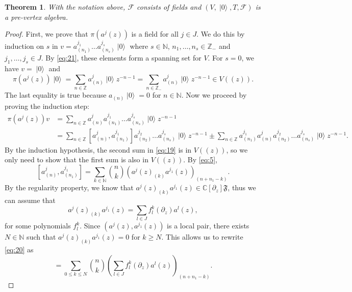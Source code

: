 \documentclass[a4paper, 12pt, reqno]{amsart}
\newtheorem{theorem}{Theorem}[subsection]
\theoremstyle{remark}
\numberwithin{equation}{subsection}
\DeclareMathOperator{\vac}{|0\rangle}
\begin{document}
\begin{theorem}
  \label{thr:15}
  With the notation above, $\mathcal{F}$ consists of fields and $(V, \vac, T, \mathcal{F})$ is a pre-vertex algebra.
\end{theorem}

\begin{proof}
  First, we prove that $\pi(a^j(z))$ is a field for all $j \in J$.
  We do this by induction on $s$ in $v = a^{j_1}_{(n_1)}\dots a^{j_s}_{(n_s)}\vac$ where $s \in \mathbb{N}$, $n_1, \dots, n_s \in \mathbb{Z}_-$ and $j_1, \dots, j_s \in J$.
  By \eqref{eq:21}, these elements form a spanning set for $V$.
  For $s = 0$, we have $v = \vac$ and
  \begin{equation*}
    \pi(a^j(z))\vac = \sum_{n \in \mathbb{Z}} a^j_{(n)}\vac z^{-n - 1} = \sum_{n \in \mathbb{Z}_-} a^j_{(n)}\vac z^{-n - 1} \in V((z)).
  \end{equation*}
  The last equality is true because $a_{(n)}\vac = 0$ for $n \in \mathbb{N}$.
  Now we proceed by proving the induction step:
  \begin{align}
    \nonumber
    \pi(a^j(z))v &= \sum_{n \in \mathbb{Z}}a^j_{(n)}a^{j_1}_{(n_1)}\dots a^{j_s}_{(n_s)}\vac z^{-n - 1} \\
    \label{eq:19}
    &= \sum_{n \in \mathbb{Z}} [a^j_{(n)}, a^{j_1}_{(n_1)}]a^{j_2}_{(n_2)}\dots a^{j_s}_{(n_s)}\vac z^{-n - 1} \pm \sum_{n \in \mathbb{Z}}a^{j_1}_{(n_1)}a^j_{(n)}a^{j_2}_{(n_2)}\dots a^{j_s}_{(n_s)}\vac z^{-n - 1}.
  \end{align}
  By the induction hypothesis, the second sum in \eqref{eq:19} is in $V((z))$, so we only need to show that the first sum is also in $V((z))$.
  By \eqref{eq:5},
  \begin{equation}
    \label{eq:20}
    [a^j_{(n)}, a^{j_1}_{(n_1)}] = \sum_{k \in \mathbb{N}}\binom{n}{k}(a^j(z)_{(k)}a^{j_1}(z))_{(n + n_1 - k)}.
  \end{equation}
  By the regularity property, we know that $a^j(z)_{(k)}a^{j_1}(z) \in \mathbb{C}[\partial_z]\mathfrak{F}$, thus we can assume that
  \begin{equation*}
    a^j(z)_{(k)}a^{j_1}(z) = \sum_{l \in J}f^k_l(\partial_z)a^l(z),
  \end{equation*}
  for some polynomials $f^k_l$.
  Since $(a^j(z), a^{j_1}(z))$ is a local pair, there exists $N \in \mathbb{N}$ such that $a^j(z)_{(k)}a^{j_1}(z) = 0$ for $k \ge N$.
  This allows us to rewrite \eqref{eq:20} as
  \begin{equation*}
    [a^j_{(n)}, a^{j_1}_{(n_1)}] = \sum_{0 \le k \le N}\binom{n}{k}\left(\sum_{l \in J}f^k_l(\partial_z)a^l(z)\right)_{(n + n_1 - k)}.

\end{equation*}
\end{proof}
\end{document}
